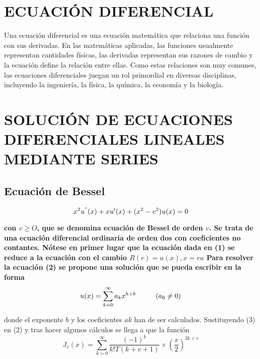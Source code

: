 \documentclass[12pt,a4paper]{article}
\begin{document}
\vspace{0,5cm}
\section{ECUACI\'ON DIFERENCIAL}

\vspace{0,1cm}
Una ecuación diferencial es una ecuación matemática que relaciona una función con sus derivadas. En las matemáticas aplicadas, las funciones usualmente representan cantidades físicas, las derivadas representan sus razones de cambio y la ecuación define la relación entre ellas. Como estas relaciones son muy comunes, las ecuaciones diferenciales juegan un rol primordial en diversas disciplinas, incluyendo la ingeniería, la física, la química, la economía y la biología.

\vspace{0,1cm}
\section{SOLUCI\'ON DE ECUACIONES DIFERENCIALES LINEALES MEDIANTE SERIES}
\vspace{0,1cm}
\subsection{Ecuaci\'on de Bessel}
 
 $$ x^{2}u^{"}(x)+ xu{'}(x)+(x^{2}-v^{2})u(x)=0 $$
 
 \textbf{con $v\geq O$, que se denomina ecuación de Bessel de orden $v$. Se trata de una ecuación diferencial ordinaria de orden dos con coeficientes no contantes. Nótese en primer lugar que la ecuación dada en (1) se reduce a la ecuación  con el cambio             
$R(r)=u(x), x =ru $ Para resolver la ecuación (2) se propone una solución que se pueda escribir en la forma}
\begin{equation*}
u(x)=\sum _{k=0}^{\infty}a_kx^{k+b}\hspace*{1cm}   (a_0\neq 0 )
\end{equation*}

\vspace{0,1cm}

  donde el exponente $b$ y los coeficientes $ak$ han de ser calculados. Sustituyendo (3) en (2) y
tras hacer algunos cálculos se llega a que la función
\begin{equation*}
J_v(x)=\sum _{k=0}^{\infty}\frac{(-1)^k}{k!T(k+v+1)}
\times\left(\frac {x}{2} \right)^{2k+v}
\end{equation*} 
\end{document}
